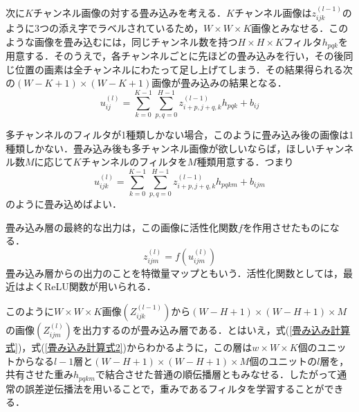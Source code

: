 \documentclass[a4paper,11pt]{jsreport}
\begin{document}
次に$K$チャンネル画像の対する畳み込みを考える．$K$チャンネル画像は$z_{ijk}^{(l-1)}$のように3つの添え字でラベルされているため，$W \times W \times K$画像とみなせる．このような画像を畳み込むには，同じチャンネル数を持つ$H \times H \times K$フィルタ$h_{pqk}$を用意する．そのうえで，各チャンネルごとに先ほどの畳み込みを行い，その後同じ位置の画素は全チャンネルにわたって足し上げてしまう．その結果得られる次の$(W-K+1)\times(W-K+1)$画像が畳み込みの結果となる．
\begin{equation}
  u_{ij}^{(l)}
  = \sum_{k=0}^{K-1}\sum_{p,q=0}^{H-1} z_{i+p,j+q,k}^{(l-1)} h_{pqk} + b_{ij}
\end{equation} \par
多チャンネルのフィルタが1種類しかない場合，このように畳み込み後の画像は1種類しかない．畳み込み後も多チャンネル画像が欲しいならば，ほしいチャンネル数$M$に応じて$K$チャンネルのフィルタを$M$種類用意する．つまり
\begin{equation}
  u_{ijk}^{(l)}
  = \sum_{k=0}^{K-1}\sum_{p,q=0}^{H-1} z_{i+p,j+q,k}^{(l-1)} h_{pqkm} + b_{ijm}
  \label{畳み込み計算式}
\end{equation}
のように畳み込めばよい．\par
畳み込み層の最終的な出力は，この画像に活性化関数$f$を作用させたものになる．
\begin{equation}
  z_{ijm}^{(l)}
  = f(u_{ijm}^{(l)})
  \label{畳み込み計算式2}
\end{equation}
畳み込み層からの出力のことを特徴量マップともいう．活性化関数としては，最近はよくReLU関数が用いられる．\par
このように$W \times W \times K$画像$(Z_{ijk}^{(l-1)})$から$(W-H+1) \times (W-H+1) \times M$の画像$(Z_{ijm}^{(l)})$を出力するのが畳み込み層である．とはいえ，式(\ref{畳み込み計算式})，式(\ref{畳み込み計算式2})からわかるように，この層は$w \times W \times K$個のユニットからなる$l-1$層と$(W-H+1) \times (W-H+1) \times M$個のユニットの$l$層を，共有させた重み${h_{pqkm}}$で結合させた普通の順伝播層ともみなせる．したがって通常の誤差逆伝播法を用いることで，重みであるフィルタを学習することができる．
\end{document}

